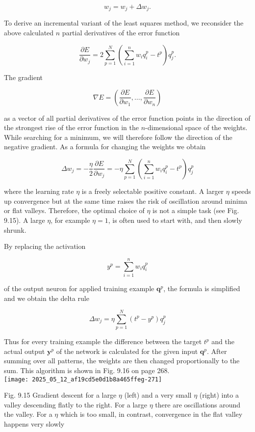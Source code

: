 \documentclass[10pt]{article}
\begin{document}
$$
w_{j}=w_{j}+\Delta w_{j} .
$$

To derive an incremental variant of the least squares method, we reconsider the above calculated $n$ partial derivatives of the error function

$$
\frac{\partial E}{\partial w_{j}}=2 \sum_{p=1}^{N}\left(\sum_{i=1}^{n} w_{i} q_{i}^{p}-t^{p}\right) q_{j}^{p} .
$$

The gradient

$$
\nabla E=\left(\frac{\partial E}{\partial w_{1}}, \ldots, \frac{\partial E}{\partial w_{n}}\right)
$$

as a vector of all partial derivatives of the error function points in the direction of the strongest rise of the error function in the $n$-dimensional space of the weights. While searching for a minimum, we will therefore follow the direction of the negative gradient. As a formula for changing the weights we obtain

$$
\Delta w_{j}=-\frac{\eta}{2} \frac{\partial E}{\partial w_{j}}=-\eta \sum_{p=1}^{N}\left(\sum_{i=1}^{n} w_{i} q_{i}^{p}-t^{p}\right) q_{j}^{p}
$$

where the learning rate $\eta$ is a freely selectable positive constant. A larger $\eta$ speeds up convergence but at the same time raises the risk of oscillation around minima or flat valleys. Therefore, the optimal choice of $\eta$ is not a simple task (see Fig. 9.15). A large $\eta$, for example $\eta=1$, is often used to start with, and then slowly shrunk.

By replacing the activation

$$
y^{p}=\sum_{i=1}^{n} w_{i} q_{i}^{p}
$$

of the output neuron for applied training example $\boldsymbol{q}^{p}$, the formula is simplified and we obtain the delta rule

$$
\Delta w_{j}=\eta \sum_{p=1}^{N}\left(t^{p}-y^{p}\right) q_{j}^{p}
$$

Thus for every training example the difference between the target $t^{p}$ and the actual output $\boldsymbol{y}^{p}$ of the network is calculated for the given input $\boldsymbol{q}^{p}$. After summing over all patterns, the weights are then changed proportionally to the sum. This algorithm is shown in Fig. 9.16 on page 268.\\
\texttt{[image: 2025\_05\_12\_af19cd5e0d1b8a465ffeg-271]}

Fig. 9.15 Gradient descent for a large $\eta$ (left) and a very small $\eta$ (right) into a valley descending flatly to the right. For a large $\eta$ there are oscillations around the valley. For a $\eta$ which is too small, in contrast, convergence in the flat valley happens very slowly
\end{document}
